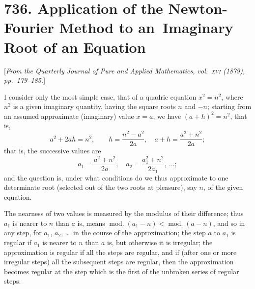 \documentclass[11pt,a4paper]{book}
\begin{document}
\newpage
\section*{736. Application of the Newton-Fourier Method to an\ Imaginary Root of an Equation}

[\textit{From the Quarterly Journal of Pure and Applied Mathematics, vol.~\textsc{xvi} (1879),
pp.~179--185.}]

I consider only the most simple case, that of a quadric equation
$x^2=n^2$, where $n^2$ is a given imaginary quantity, having the square
roots $n$ and $-n$; starting from an assumed approximate (imaginary) value
$x=a$, we have $(a+h)^2=n^2$, that is,
\[
a^2+2ah=n^2,\qquad h=\frac{n^2-a^2}{2a},\quad a+h=\frac{a^2+n^2}{2a};
\]
that is, the successive values are
\[
a_1=\frac{a^2+n^2}{2a},\quad a_2=\frac{a_1^2+n^2}{2a_1},\ \ldots;
\]
and the question is, under what conditions do we thus approximate to
one determinate root (selected out of the two roots at pleasure), say $n$,
of the given equation.

The nearness of two values is measured by the modulus of their
difference; thus $a_1$ is nearer to $n$ than $a$ is, means
$\operatorname{mod.}(a_1-n)<\operatorname{mod.}(a-n)$, and so in any step, for
$a_1$, $a_2$, \dots\ in the course of the approximation; the step $a$ to $a_1$
is regular if $a_1$ is nearer to $n$ than $a$ is, but otherwise it is irregular;
the approximation is regular if all the steps are regular, and if (after one
or more irregular steps) all the subsequent steps are regular, then the
approximation becomes regular at the step which is the first of the
unbroken series of regular steps.
\end{document}
